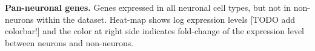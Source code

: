 \textbf{Pan-neuronal genes.} 
Genes expressed in all neuronal cell types, but not in non-neurons within the dataset. Heat-map shows log expression levels [TODO add colorbar!] and the color at right side indicates fold-change of the expression level between neurons and non-neurons.